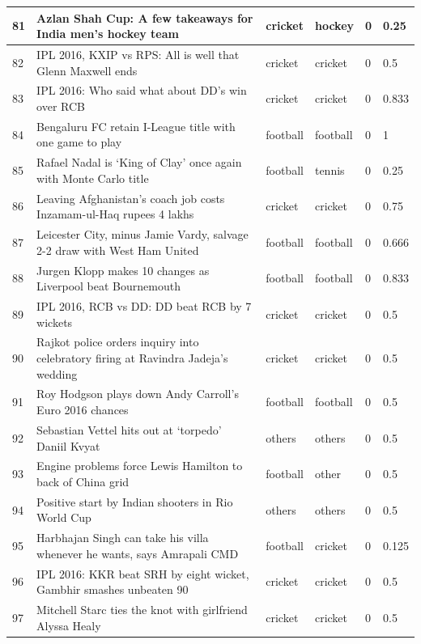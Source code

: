 \documentclass[12pt]{article}
\begin{document}
\begin{longtable}{|p{2.0cm} | p{6.0cm} | p{2.0cm} |p{2.0cm}| p{2.0cm}|p{2.0cm}|}
81 & Azlan Shah Cup: A few takeaways for India men’s hockey team & cricket & hockey & 0 & 0.25 \\\hline													
82 & IPL 2016, KXIP vs RPS: All is well that Glenn Maxwell ends & cricket & cricket & 0 & 0.5 \\\hline													
83 & IPL 2016: Who said what about DD’s win over RCB & cricket & cricket & 0 & 0.833 \\\hline													
84 & Bengaluru FC retain I-League title with one game to play & football & football & 0 & 1 \\\hline													
85 & Rafael Nadal is ‘King of Clay’ once again with Monte Carlo title & football & tennis & 0 & 0.25 \\\hline													
86 & Leaving Afghanistan’s coach job costs Inzamam-ul-Haq rupees 4 lakhs & cricket & cricket & 0 & 0.75 \\\hline													
87 & Leicester City, minus Jamie Vardy, salvage 2-2 draw with West Ham United & football & football & 0 & 0.666 \\\hline													
88 & Jurgen Klopp makes 10 changes as Liverpool beat Bournemouth & football & football & 0 & 0.833 \\\hline													
89 & IPL 2016, RCB vs DD: DD beat RCB by 7 wickets & cricket & cricket & 0 & 0.5 \\\hline													
90 & Rajkot police orders inquiry into celebratory firing at Ravindra Jadeja’s wedding & cricket & cricket & 0 & 0.5 \\\hline													
91 & Roy Hodgson plays down Andy Carroll’s Euro 2016 chances & football & football & 0 & 0.5 \\\hline													
92 & Sebastian Vettel hits out at ‘torpedo’ Daniil Kvyat & others & others & 0 & 0.5 \\\hline													
93 & Engine problems force Lewis Hamilton to back of China grid & football & other & 0 & 0.5 \\\hline													
94 & Positive start by Indian shooters in Rio World Cup & others & others & 0 & 0.5 \\\hline													
95 & Harbhajan Singh can take his villa whenever he wants, says Amrapali CMD & football & cricket & 0 & 0.125 \\\hline													
96 & IPL 2016: KKR beat SRH by eight wicket, Gambhir smashes unbeaten 90 & cricket & cricket & 0 & 0.5 \\\hline													
97 & Mitchell Starc ties the knot with girlfriend Alyssa Healy & cricket & cricket & 0 & 0.5 \\\hline													

\end{longtable}
\end{document}
